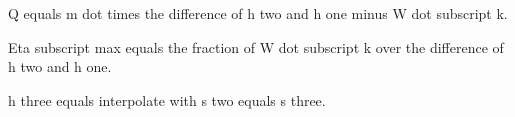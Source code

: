 Q equals m dot times the difference of h two and h one minus W dot subscript k.

Eta subscript max equals the fraction of W dot subscript k over the difference of h two and h one.

h three equals interpolate with s two equals s three.